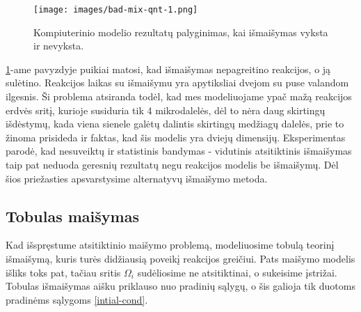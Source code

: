 \newpage
\begin{figure}[h!]
    \centering
    \texttt{[image: images/bad-mix-qnt-1.png]}
    \caption{Kompiuterinio modelio rezultatų palyginimas, kai išmaišymas vyksta ir nevyksta.  }
    \label{bad-mix-qnt-example}
\end{figure}
\ref{bad-mix-qnt-example}-ame pavyzdyje puikiai matosi, kad išmaišymas nepagreitino reakcijos, o ją sulėtino. Reakcijos laikas su išmaišymu yra apytiksliai dvejom su puse valandom ilgesnis. Ši problema atsiranda todėl, kad mes modeliuojame ypač mažą reakcijos erdvės sritį, kurioje susiduria tik 4 mikrodalelės, dėl to nėra daug skirtingų išdėstymų, kada viena sienele galėtų dalintis skirtingų medžiagų dalelės, prie to žinoma prisideda ir faktas, kad šis modelis yra dviejų dimensijų. Eksperimentas parodė, kad nesuveiktų ir statistinis bandymas - vidutinis atsitiktinis išmaišymas taip pat neduoda geresnių rezultatų negu reakcijos modelis be išmaišymų. Dėl šios priežasties apsvarstysime alternatyvų išmaišymo metoda.

\subsection{Tobulas maišymas}

Kad išspręstume atsitiktinio maišymo problemą, modeliuosime tobulą teorinį išmaišymą, kuris turės didžiausią poveikį reakcijos greičiui. Pats maišymo modelis išliks toks pat, tačiau sritis $\Omega_i$ sudėliosime ne atsitiktinai, o sukeisime įstrižai. Tobulas išmaišymas aišku priklauso nuo pradinių sąlygų, o šis galioja tik duotoms pradinėms sąlygoms \eqref{intial-cond}.

